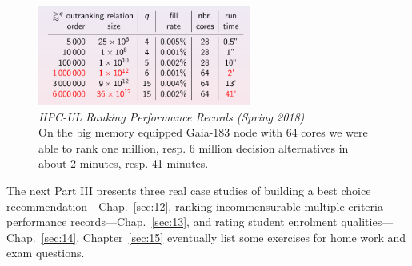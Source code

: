 \begin{figure}[ht]
\sidecaption[t]
\includegraphics[width=7cm]{Figures/11-2-rankingRecords.png}
\caption[HPC-UL Ranking Performance Records (Spring 2018)]{\emph{HPC-UL Ranking Performance Records (Spring 2018)}\\ On the big memory equipped Gaia-183 node with 64 cores we were able to rank one million, resp. 6 million decision alternatives in about 2 minutes, resp. 41 minutes.}
\label{fig:11.2}       %
\end{figure}

\vspace{\baselineskip}
The next Part III presents three real case studies of building a best choice recommendation---Chap.~\ref{sec:12}, ranking incommensurable multiple-criteria performance records---Chap.~\ref{sec:13}, and rating student enrolment qualities---Chap.~\ref{sec:14}. Chapter~\ref{sec:15} eventually list some exercises for home work and exam questions.

%
%
